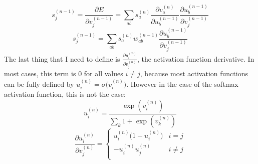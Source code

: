 \documentclass{article}
\begin{document}
\[s_j^{(n-1)} =\frac{\partial E}{\partial v_{j}^{(n-1)}} =  \sum_{a b} s_a^{(n)} \frac{\partial v_{a}^{(n)}}{\partial u_{b}^{(n-1)}}\frac{\partial u_{b}^{(n-1)}}{\partial v_{j}^{(n-1)}} \]
\[s_j^{(n-1)} =\sum_{a b} s_a^{(n)} w_{a b}^{(n-1)}\frac{\partial u_{b}^{(n-1)}}{\partial v_{j}^{(n-1)}} \]
The last thing that I need to define is \(\frac{\partial u_{i}^{(n)}}{\partial v_{j}^{(n)}}\), the activation function derivative. In most cases, this term is 0 for all values \(i \neq j\), because most activation functions can be fully defined by \(u_i^{(n)} = \sigma \big(v_i^{(n)}\big)\). However in the case of the softmax activation function, this is not the case:
\[u_i^{(n)} = \frac{\exp(v_i^{(n)})}{\sum_k 1 + \exp(v_k^{(n)})}\]
\[\frac{\partial u_{i}^{(n)}}{\partial v_{j}^{(n)}} = 
\begin{cases}
u_i^{(n)} \big(1-u_i^{(n)}\big) & i = j\\
-u_i^{(n)} u_j^{(n)} & i \neq j\\
\end{cases}\]
\end{document}
